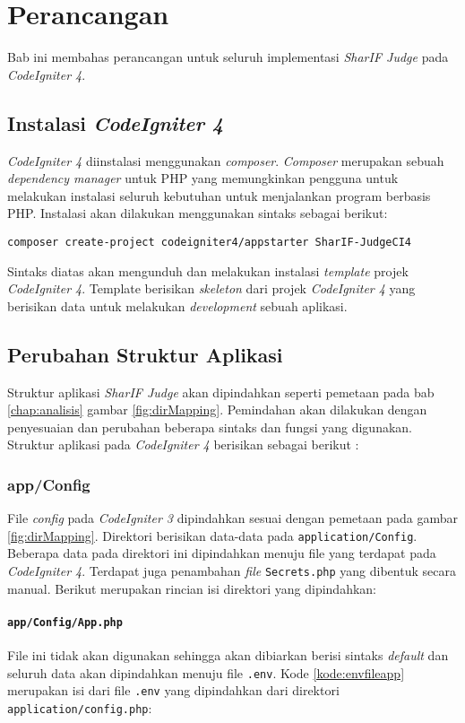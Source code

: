 \chapter{Perancangan}
\label{chap:perancangan}
Bab ini membahas perancangan untuk seluruh implementasi \textit{SharIF Judge} pada \textit{CodeIgniter 4}.

\section{Instalasi \textit{CodeIgniter 4}}
\textit{CodeIgniter 4} diinstalasi menggunakan \textit{composer}. \textit{Composer} merupakan sebuah \textit{dependency manager} untuk PHP yang memungkinkan pengguna untuk melakukan instalasi seluruh kebutuhan untuk menjalankan program berbasis PHP. Instalasi akan dilakukan menggunakan sintaks sebagai berikut:

\begin{center}
\verb|composer create-project codeigniter4/appstarter SharIF-JudgeCI4|
\end{center}

Sintaks diatas akan mengunduh dan melakukan instalasi \textit{template} projek \textit{CodeIgniter 4}. Template berisikan \textit{skeleton} dari projek \textit{CodeIgniter 4} yang berisikan data untuk melakukan \textit{development} sebuah aplikasi.

\section{Perubahan Struktur Aplikasi}
\label{sec:perubahanStruktur}
Struktur aplikasi \textit{SharIF Judge} akan dipindahkan seperti pemetaan pada bab \ref{chap:analisis} gambar \ref{fig:dirMapping}. Pemindahan akan dilakukan dengan penyesuaian dan perubahan beberapa sintaks dan fungsi yang digunakan. Struktur aplikasi pada \textit{CodeIgniter 4} berisikan sebagai berikut :
\subsection{app/Config}
File \textit{config} pada \textit{CodeIgniter 3} dipindahkan sesuai dengan pemetaan pada gambar \ref{fig:dirMapping}. Direktori berisikan data-data pada \texttt{application/Config}. Beberapa data pada direktori ini dipindahkan menuju file yang terdapat pada \textit{CodeIgniter 4}. Terdapat juga penambahan \textit{file} \texttt{Secrets.php} yang dibentuk secara manual. Berikut merupakan rincian isi direktori yang dipindahkan:
\subsubsection{\texttt{app/Config/App.php}}
File ini tidak akan digunakan sehingga akan dibiarkan berisi sintaks \textit{default} dan seluruh data akan dipindahkan menuju file \texttt{.env}. Kode \ref{kode:envfileapp} merupakan isi dari file \texttt{.env} yang dipindahkan dari direktori \texttt{application/config.php}:

